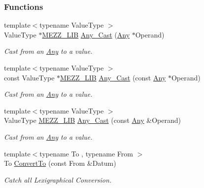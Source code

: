 \subsubsection*{Functions}
\begin{DoxyCompactItemize}
\item 
{\footnotesize template$<$typename Value\-Type $>$ }\\Value\-Type $\ast$\hyperlink{crossplatformexport_8h_a455f91aab9e6a1cf4286f5cdfa74c7bc}{M\-E\-Z\-Z\-\_\-\-L\-I\-B} \hyperlink{namespaceMezzanine_aa2955c8584af773c08b144741a826ebc}{Any\-\_\-\-Cast} (\hyperlink{classMezzanine_1_1Any}{Any} $\ast$Operand)
\begin{DoxyCompactList}\small\item\em Cast from an \hyperlink{classMezzanine_1_1Any}{Any} to a value. \end{DoxyCompactList}\item 
{\footnotesize template$<$typename Value\-Type $>$ }\\const Value\-Type $\ast$\hyperlink{crossplatformexport_8h_a455f91aab9e6a1cf4286f5cdfa74c7bc}{M\-E\-Z\-Z\-\_\-\-L\-I\-B} \hyperlink{namespaceMezzanine_a694cb0e3b3de1b3dd6e9908853842f09}{Any\-\_\-\-Cast} (const \hyperlink{classMezzanine_1_1Any}{Any} $\ast$Operand)
\begin{DoxyCompactList}\small\item\em Cast from an \hyperlink{classMezzanine_1_1Any}{Any} to a value. \end{DoxyCompactList}\item 
{\footnotesize template$<$typename Value\-Type $>$ }\\Value\-Type \hyperlink{crossplatformexport_8h_a455f91aab9e6a1cf4286f5cdfa74c7bc}{M\-E\-Z\-Z\-\_\-\-L\-I\-B} \hyperlink{namespaceMezzanine_a4a3a4fa27d75474bced4fbb103473f79}{Any\-\_\-\-Cast} (const \hyperlink{classMezzanine_1_1Any}{Any} \&Operand)
\begin{DoxyCompactList}\small\item\em Cast from an \hyperlink{classMezzanine_1_1Any}{Any} to a value. \end{DoxyCompactList}\item 
{\footnotesize template$<$typename To , typename From $>$ }\\To \hyperlink{namespaceMezzanine_a36fefd8e3d822274f02c7633b0ef5072}{Convert\-To} (const From \&Datum)
\begin{DoxyCompactList}\small\item\em Catch all Lexigraphical Conversion. \end{DoxyCompactList}\item 

\end{DoxyCompactItemize}
